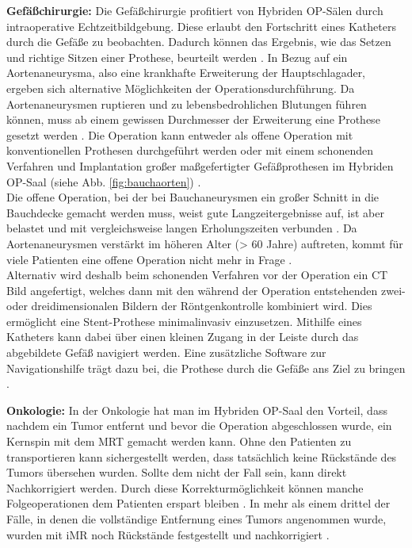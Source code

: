 \textbf{Gefäßchirurgie:}
Die Gefäßchirurgie profitiert von Hybriden OP-Sälen durch intraoperative Echtzeitbildgebung. Diese erlaubt den Fortschritt eines Katheters durch die Gefäße zu beobachten. Dadurch können das Ergebnis, wie das Setzen und richtige Sitzen einer Prothese, beurteilt werden \cite{DresdnerUniklinikum,TickendeBombeImBauch}.
In Bezug auf ein Aortenaneurysma, also eine krankhafte Erweiterung der Hauptschlagader, ergeben sich alternative Möglichkeiten der Operationsdurchführung. Da Aortenaneurysmen ruptieren und zu lebensbedrohlichen Blutungen führen können, muss ab einem gewissen Durchmesser der Erweiterung eine Prothese gesetzt werden \cite{Aortenaneurysma}. Die Operation kann entweder als offene Operation mit konventionellen Prothesen durchgeführt werden oder mit einem schonenden Verfahren und Implantation großer maßgefertigter Gefäßprothesen im Hybriden OP-Saal (siehe Abb. \ref{fig:bauchaorten}) \cite{DresdnerUniklinikum}. \\
Die offene Operation, bei der bei Bauchaneurysmen ein großer Schnitt in die Bauchdecke gemacht werden muss, weist gute Langzeitergebnisse auf, ist aber belastet und mit vergleichsweise langen Erholungszeiten verbunden \cite{TickendeBombeImBauch}. Da Aortenaneurysmen verstärkt im höheren Alter (> 60 Jahre) auftreten, kommt für viele Patienten eine offene Operation nicht mehr in Frage \cite{Aortenaneurysma}. \\
Alternativ wird deshalb beim schonenden Verfahren vor der Operation ein CT Bild angefertigt, welches dann mit den während der Operation entstehenden zwei- oder dreidimensionalen Bildern der Röntgenkontrolle kombiniert wird. Dies ermöglicht eine Stent-Prothese minimalinvasiv einzusetzen. Mithilfe eines Katheters kann dabei über einen kleinen Zugang in der Leiste durch das abgebildete Gefäß navigiert werden. Eine zusätzliche Software zur Navigationshilfe trägt dazu bei, die Prothese durch die Gefäße ans Ziel zu bringen \cite{DresdnerUniklinikum,TickendeBombeImBauch}.

\textbf{Onkologie:}
In der Onkologie hat man im Hybriden OP-Saal den Vorteil, dass nachdem ein Tumor entfernt und bevor die Operation abgeschlossen wurde, ein Kernspin mit dem MRT gemacht werden kann. Ohne den Patienten zu transportieren kann sichergestellt werden, dass tatsächlich keine Rückstände des Tumors übersehen wurden. Sollte dem nicht der Fall sein, kann direkt Nachkorrigiert werden. Durch diese Korrekturmöglichkeit können manche Folgeoperationen dem Patienten erspart bleiben \cite{AerzteZeitung}. In mehr als einem drittel der Fälle, in denen die vollständige Entfernung eines Tumors angenommen wurde, wurden mit iMR noch Rückstände festgestellt und nachkorrigiert \cite{BrainShiftInTumorResection}.

